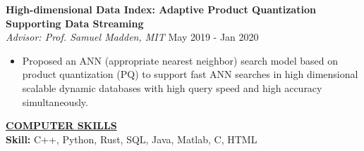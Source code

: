 \documentclass{article}
\begin{document}
\noindent  
\textbf{High-dimensional Data Index: Adaptive Product Quantization Supporting Data Streaming} \\
\textit{Advisor: Prof. Samuel Madden, MIT} \hfill May 2019 - Jan 2020 
\begin{itemize}[noitemsep,nolistsep,leftmargin=*]
\item Proposed an ANN (appropriate nearest neighbor) search model based on product quantization (PQ) to support fast ANN searches in high dimensional scalable dynamic databases with high query speed and high accuracy simultaneously.
\end{itemize}  


 



\noindent \textbf{\underline{COMPUTER SKILLS}} \\
\noindent \textbf{Skill:} 
C++, Python, Rust, SQL, Java, Matlab, C, HTML
\end{document}
